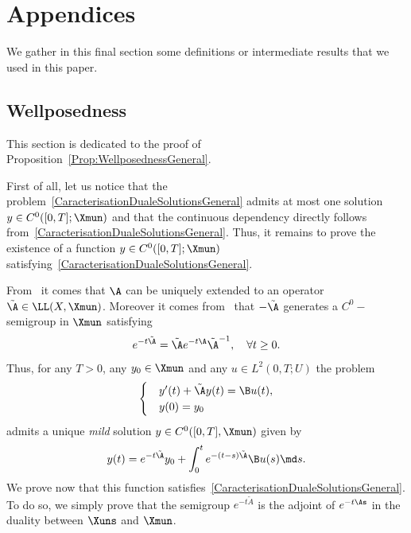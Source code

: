 \section{Appendices} \label{Sec:Annexe}

We gather in this final section some definitions or intermediate results that we used in this paper.


\subsection{Wellposedness} \label{Sec:AnnexeWellposedness}


This section is dedicated to the proof of Proposition~\ref{Prop:WellposednessGeneral}.

First of all, let us notice that the problem~\eqref{CaracterisationDualeSolutionsGeneral} admits at most one solution $y \in C^0([0,T]; \Xmun)$ and that the continuous dependency directly follows from~\eqref{CaracterisationDualeSolutionsGeneral}. Thus, it remains to prove the existence of a function $y \in C^0([0,T]; \Xmun)$ satisfying~\eqref{CaracterisationDualeSolutionsGeneral}.

From~\cite[Proposition~2.10.3]{TucsnakWeissBook} it comes that $\A$ can be uniquely extended to an operator $\tilde{\A} \in \LL(X, \Xmun)$. Moreover it comes from~\cite[Proposition~2.10.4]{TucsnakWeissBook} that $-\tilde{\A}$ generates a $C^0-$semigroup in $\Xmun$ satisfying
\begin{equation*}\label{Def:SemiGroupeEtendu}
e^{-t \tilde{\A}} = \tilde{\A} e^{-t \A} \tilde{\A}^{-1}, \quad \forall t \geq 0.
\end{equation*}
Thus, for any $T>0$, any $y_0 \in \Xmun$ and any $u \in L^2(0,T ; U)$ the problem
\begin{equation*}\label{systemeEtendu}
\begin{cases}
&y'(t) + \tilde{\A} y(t) = \B u(t),
\\
&y(0) = y_0
\end{cases}
\end{equation*}
admits a unique \emph{mild} solution $y \in C^0([0,T], \Xmun)$ given by
\begin{equation}\label{MildSolution}
y(t) = e^{-t \tilde{\A}} y_0 + \int_0^t e^{-(t-s) \tilde{\A}} \B u(s) \md s.
\end{equation}
We prove now that this function satisfies~\eqref{CaracterisationDualeSolutionsGeneral}. To do so, we simply prove that the semigroup $e^{-t \tilde{A}}$ is the adjoint of $e^{-t\As}$ in the duality between $\Xuns$ and $\Xmun$.

